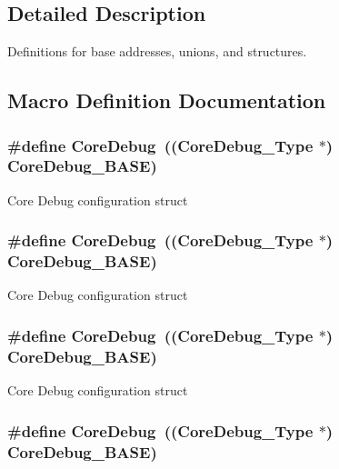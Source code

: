 \subsection{Detailed Description}
Definitions for base addresses, unions, and structures. 

\subsection{Macro Definition Documentation}
\hypertarget{group___c_m_s_i_s__core__base_gab6e30a2b802d9021619dbb0be7f5d63d}{
\subsubsection[{Core\-Debug}]{\setlength{\rightskip}{0pt plus 5cm}\#define Core\-Debug~(({\bf Core\-Debug\-\_\-\-Type} $\ast$)     {\bf Core\-Debug\-\_\-\-B\-A\-S\-E})}}\label{group___c_m_s_i_s__core__base_gab6e30a2b802d9021619dbb0be7f5d63d}
Core Debug configuration struct \hypertarget{group___c_m_s_i_s__core__base_gab6e30a2b802d9021619dbb0be7f5d63d}{
\subsubsection[{Core\-Debug}]{\setlength{\rightskip}{0pt plus 5cm}\#define Core\-Debug~(({\bf Core\-Debug\-\_\-\-Type} $\ast$)     {\bf Core\-Debug\-\_\-\-B\-A\-S\-E})}}\label{group___c_m_s_i_s__core__base_gab6e30a2b802d9021619dbb0be7f5d63d}
Core Debug configuration struct \hypertarget{group___c_m_s_i_s__core__base_gab6e30a2b802d9021619dbb0be7f5d63d}{
\subsubsection[{Core\-Debug}]{\setlength{\rightskip}{0pt plus 5cm}\#define Core\-Debug~(({\bf Core\-Debug\-\_\-\-Type} $\ast$)     {\bf Core\-Debug\-\_\-\-B\-A\-S\-E})}}\label{group___c_m_s_i_s__core__base_gab6e30a2b802d9021619dbb0be7f5d63d}
Core Debug configuration struct \hypertarget{group___c_m_s_i_s__core__base_gab6e30a2b802d9021619dbb0be7f5d63d}{
\subsubsection[{Core\-Debug}]{\setlength{\rightskip}{0pt plus 5cm}\#define Core\-Debug~(({\bf Core\-Debug\-\_\-\-Type} $\ast$)     {\bf Core\-Debug\-\_\-\-B\-A\-S\-E})}}\label{group___c_m_s_i_s__core__base_gab6e30a2b802d9021619dbb0be7f5d63d}
